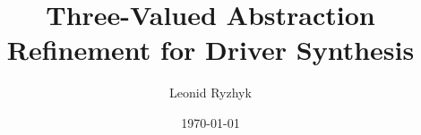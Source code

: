 \documentclass[a4paper,11pt]{article}
\title{Three-Valued Abstraction Refinement for Driver Synthesis}
\author{Leonid Ryzhyk}
\date{\today}
\begin{document}
\maketitle

\cite{deAlfaro_Roy_07}




\end{document}
